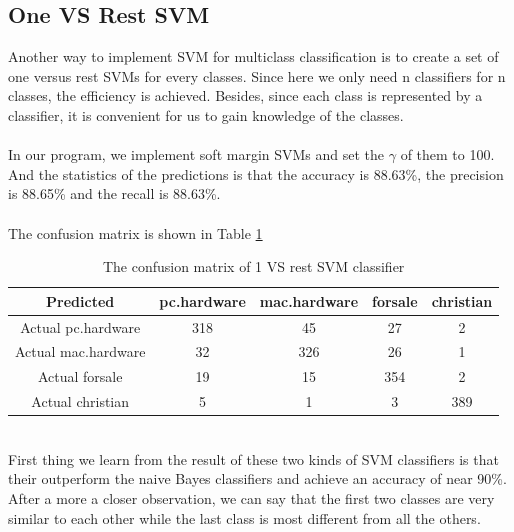 \documentclass{article}
\begin{document}
\subsection{One VS Rest SVM}
Another way to implement SVM for multiclass classification is to create a set of one versus rest SVMs for every classes. Since here we only need n classifiers for n classes, the efficiency is achieved. Besides, since each class is represented by a classifier, it is convenient for us to gain knowledge of the classes.\\
\\
In our program, we implement soft margin SVMs and set the $\gamma$ of them to 100. And the statistics of the predictions is that the accuracy is 88.63\%, the precision is 88.65\% and the recall is 88.63\%.\\
\\
The confusion matrix is shown in Table \ref{tb:confu_mul_svm_ovr}
\begin{table}
\begin{center}
\caption{The confusion matrix of 1 VS rest SVM classifier}
\label{tb:confu_mul_svm_ovr}
\begin{tabular}{|c|c|c|c|c|}
\hline
Predicted&pc.hardware&mac.hardware&forsale&christian\\
\hline
Actual pc.hardware&318&45&27&2\\
\hline
Actual mac.hardware&32&326&26&1\\
\hline
Actual forsale&19&15&354&2\\
\hline
Actual christian&5&1&3&389\\
\hline
\end{tabular}
\end{center}
\end{table}
\\
First thing we learn from the result of these two kinds of SVM classifiers is that their outperform the naive Bayes classifiers and achieve an accuracy of near 90\%. After a more a closer observation, we can say that the first two classes are very similar to each other while the last class is most different from all the others.
\end{document}
